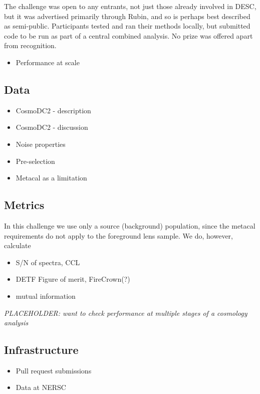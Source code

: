 \documentclass[twocolumn,twocolappendix]{aastex63}
\newcommand{\placeholder}[1]{\textit{PLACEHOLDER: #1}}
\begin{document}
The challenge was open to any entrants, not just those already involved in DESC, but it was
advertised primarily through Rubin, and so is perhaps best described as semi-public.
Participants tested and ran their methods locally, but submitted code to be run as part of a central
combined analysis.  No prize was offered apart from recognition.



\begin{itemize}
    \item Performance at scale
\end{itemize}

\subsection{Data}
\label{sec:data}


\begin{itemize}
    \item CosmoDC2 - description
    \item CosmoDC2 - discussion
    \item Noise properties
    \item Pre-selection 
    \item Metacal as a limitation
\end{itemize}

\subsection{Metrics}
\label{sec:metrics}



In this challenge we use only a source (background) population, since the metacal requirements
do not apply to the foreground lens sample. We do, however, calculate 

\begin{itemize}
    \item S/N of spectra, CCL
    \item DETF Figure of merit, FireCrown(?)
    \item mutual information
\end{itemize}


\placeholder{want to check performance at multiple stages of a cosmology analysis}

\subsection{Infrastructure}
\begin{itemize}
    \item Pull request submissions
    \item Data at NERSC
\end{itemize}
\end{document}
